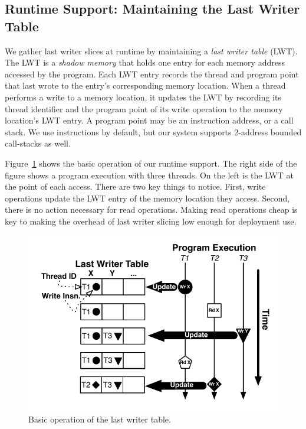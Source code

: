 \documentclass[preprint,9pt]{sigplanconf}
\newcommand{\lwt}{LWT\xspace}
\begin{document}
\subsection{Runtime Support: Maintaining the Last Writer Table}
We gather last writer slices at runtime by maintaining a {\em last writer
table} (\lwt).  The \lwt is a {\em shadow memory} that holds one entry for each
memory address accessed by the program.  Each \lwt entry records the thread and
program point that last wrote to the entry's corresponding memory location.
When a thread performs a write to a memory location, it updates the \lwt by
recording its thread identifier and the program point of its write operation to
the memory location's \lwt entry.  A program point may be an
instruction address, or a call stack.  We use instructions by default, but our
system supports 2-address bounded call-stacks as well.   

Figure~\ref{fig:basicLWT} shows the basic operation of our runtime support.
The right side of the figure shows a program execution with three threads.  On
the left is the \lwt at the point of each access.  There are two key things to
notice.  First, write operations update the \lwt entry of the memory location
they access.  Second, there is no action necessary for read operations.  Making
read operations cheap is key to making the overhead of last writer slicing low
enough for deployment use.

\begin{figure}[h]
\centering
\includegraphics[scale=.6]{figs/BasicLWT.pdf}
\caption{\label{fig:basicLWT}Basic operation of the last writer table. }
\end{figure}
\end{document}
